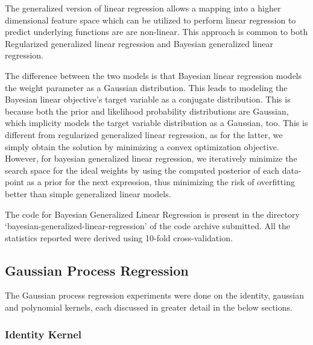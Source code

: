 \documentclass[parskip=full]{scrartcl}
\begin{document}
            The generalized version of linear regression allows a mapping into a higher dimensional feature space which can be utilized to perform linear regression to predict underlying functions are are non-linear. This approach is common to both Regularized generalized linear regression and Bayesian generalized linear regression.

            The difference between the two models is that Bayesian linear regression models the weight parameter as a Gaussian distribution. This leads to modeling the Bayesian linear objective's target variable as a conjugate distribution. This is because both the prior and likelihood probability distributions are Gaussian, which implicity models the target variable distribution as a Gaussian, too. This is different from regularized generalized linear regression, as for the latter, we simply obtain the solution by minimizing a convex optimization objective. However, for bayesian generalized linear regression, we iteratively minimize the search space for the ideal weights by using the computed posterior of each data-point as a prior for the next expression, thus minimizing the risk of overfitting better than simple generalized linear models.
        

        The code for Bayesian Generalized Linear Regression is present in the directory `bayesian-generalized-linear-regression' of the code archive submitted. All the statistics reported were derived using 10-fold cross-validation.
    

    \subsection{Gaussian Process Regression} %
    \label{sub:gaussian_process_regression}

        The Gaussian process regression experiments were done on the identity, gaussian and polynomial kernels, each discussed in greater detail in the below sections.

        \subsubsection*{Identity Kernel} %
        \label{ssub:identity_kernel}
\end{document}
